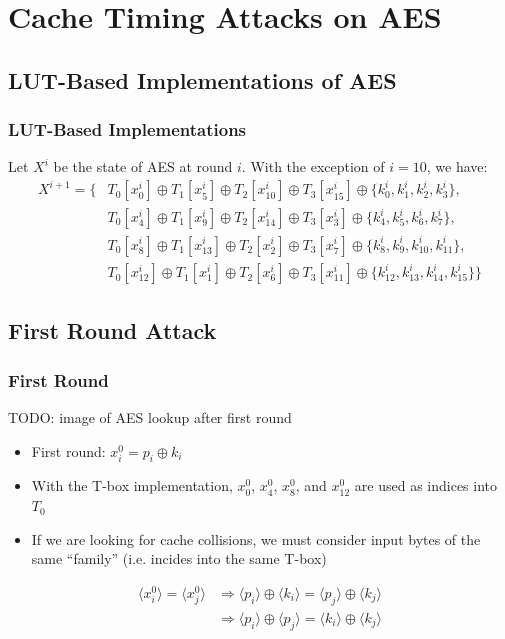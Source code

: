 \documentclass[8pt,handout]{beamer}
\begin{document}
\section{Cache Timing Attacks on AES}
\subsection{LUT-Based Implementations of AES}
\begin{frame}
	\frametitle{LUT-Based Implementations}
	Let $X^i$ be the state of AES at round $i$. With the exception of $i = 10$, we have:
\begin{align*}
X^{i+1} = \{ & T_0[x_0^i] \oplus T_1[x_5^i] \oplus T_2[x_{10}^i] \oplus T_3[x_{15}^i] \oplus \{k_0^i, k_1^i, k_2^i, k_3^i\}, \\
& T_0[x_4^i] \oplus T_1[x_{9}^i] \oplus T_2[x_{14}^i] \oplus T_3[x_3^i] \oplus \{k_4^i, k_5^i, k_6^i, k_7^i\}, \\
& T_0[x_8^i] \oplus T_1[x_{13}^i] \oplus T_2[x_2^i] \oplus T_3[x_7^i] \oplus \{k_8^i, k_9^i, k_{10}^i, k_{11}^i\}, \\
& T_0[x_{12}^i] \oplus T_1[x_1^i] \oplus T_2[x_6^i] \oplus T_3[x_{11}^i] \oplus \{k_{12}^i, k_{13}^i, k_{14}^i, k_{15}^i\}\}
\end{align*}
\end{frame}

\subsection{First Round Attack}
\begin{frame}
	\frametitle{First Round}
	TODO: image of AES lookup after first round
	\begin{itemize}
		\item First round: $x_i^{0} = p_i \oplus k_i$
		\item With the T-box implementation, $x_0^0$, $x_4^0$, $x_8^0$, and $x_{12}^0$ are 
		used as indices into $T_0$
		\item If we are looking for cache collisions, we must consider input bytes of the same ``family'' 
		(i.e. incides into the same T-box)
	\end{itemize}
	\begin{align*}
		\langle x_i^0 \rangle = \langle x_j^0 \rangle & \Rightarrow \langle p_i \rangle \oplus \langle k_i \rangle = \langle p_j \rangle \oplus \langle k_j \rangle \\
		&  \Rightarrow \langle p_i \rangle \oplus \langle p_j \rangle = \langle k_i \rangle \oplus \langle k_j \rangle 
	\end{align*}
\end{frame}
\end{document}
